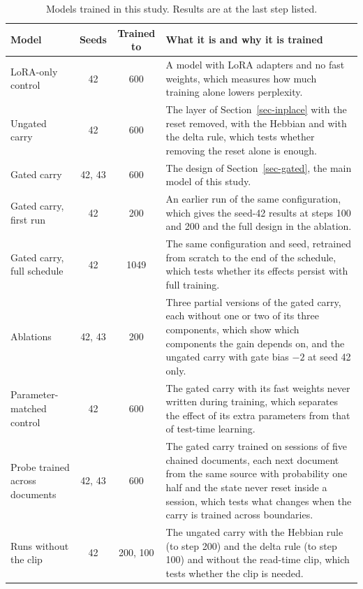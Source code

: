 \documentclass[12pt,a4paper]{report}
\begin{document}
\begin{table}[H]
  \centering
  \small
  \begin{tabularx}{\linewidth}{>{\raggedright\arraybackslash}p{3.3cm}cc>{\raggedright\arraybackslash}X}
    \toprule
    Model & Seeds & Trained to & What it is and why it is trained \\
    \midrule
    LoRA-only control & 42 & 600 & A model with LoRA adapters and no fast weights, which measures how much training alone lowers perplexity. \\
    Ungated carry & 42 & 600 & The layer of Section~\ref{sec-inplace} with the reset removed, with the Hebbian and with the delta rule, which tests whether removing the reset alone is enough. \\
    Gated carry & 42, 43 & 600 & The design of Section~\ref{sec-gated}, the main model of this study. \\
    Gated carry, first run & 42 & 200 & An earlier run of the same configuration, which gives the seed-42 results at steps 100 and 200 and the full design in the ablation. \\
    Gated carry, full schedule & 42 & 1049 & The same configuration and seed, retrained from scratch to the end of the schedule, which tests whether its effects persist with full training. \\
    Ablations & 42, 43 & 200 & Three partial versions of the gated carry, each without one or two of its three components, which show which components the gain depends on, and the ungated carry with gate bias $-2$ at seed 42 only. \\
    Parameter-matched control & 42 & 600 & The gated carry with its fast weights never written during training, which separates the effect of its extra parameters from that of test-time learning. \\
    Probe trained across documents & 42, 43 & 600 & The gated carry trained on sessions of five chained documents, each next document from the same source with probability one half and the state never reset inside a session, which tests what changes when the carry is trained across boundaries. \\
    Runs without the clip & 42 & 200, 100 & The ungated carry with the Hebbian rule (to step 200) and the delta rule (to step 100) and without the read-time clip, which tests whether the clip is needed. \\
    \bottomrule
  \end{tabularx}
    \caption{Models trained in this study. Results are at the last step listed.}
  \label{tab-models}
\end{table}
\end{document}
